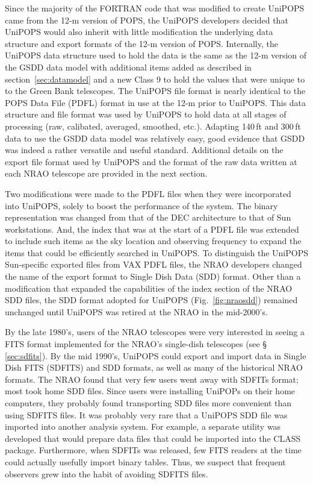 \documentclass[final,authoryear,5p,times,twocolumn]{elsarticle}
\begin{document}
Since the majority of the FORTRAN code that was modified to create
UniPOPS came from the 12-m version of POPS, the UniPOPS developers
decided that UniPOPS would also inherit with little modification the
underlying data structure and export formats of the 12-m version of
POPS.  Internally, the UniPOPS data structure used to hold the data 
is the same as the 12-m version of the GSDD data model with additional 
items added as described in section~\ref{sec:datamodel} and a new Class 9 to hold
the values that were unique to to the Green Bank telescopes. The UniPOPS
file format is nearly identical to the POPS Data File (PDFL) format
in use at the 12-m prior to UniPOPS. This
data structure and file format was used by UniPOPS to hold data at
all stages of processing (raw, calibated, averaged, smoothed, etc.).
Adapting 140\,ft and 300\,ft data to use the GSDD data model was
relatively easy, good evidence that GSDD was indeed a rather versatile
and useful standard.  Additional details on the export file format
used by UniPOPS and the format of the raw data written at each
NRAO telescope are provided in the next section.

Two modifications were made to the PDFL files when they were
incorporated into UniPOPS, solely to boost the performance of the
system.  The binary representation was changed from that of the DEC
architecture to that of Sun workstations.  And, the index that was at
the start of a PDFL file was extended to include such items as the sky
location and observing frequency to expand the items that could be
efficiently searched in UniPOPS.  To distinguish the UniPOPS
Sun-specific exported files from VAX PDFL files, the NRAO developers
changed the name of the export format to Single Dish Data (SDD) format.
Other than a modification that expanded the capabilities of the index
section of the NRAO SDD files, the SDD format adopted for UniPOPS
(Fig.~\ref{fig:nraosdd}) remained unchanged until UniPOPS was retired
at the NRAO in the mid-2000's.  

By the late 1980's, users of the NRAO telescopes were very interested
in seeing a FITS format implemented for the NRAO's single-dish
telescopes (see \S\,\ref{sec:sdfits}). By the mid 1990's,
UniPOPS could export and import data in Single Dish FITS (SDFITS) and
SDD formats, as well as many
of the historical NRAO formats.  The NRAO found that very few users
went away with SDFITs format; most took home SDD files.  Since
users were installing UniPOPs on their home computers, they probably
found transporting SDD files more convenient than using
SDFITS files.  It was probably very rare that a UniPOPS SDD file was
imported into another analysis system.  For example, a separate
utility was developed that would prepare data files that could be
imported into the {\textsc CLASS} package.
Furthermore, when SDFITs was released, few FITS readers at the
time could actually usefully import binary tables.  Thus, we suspect
that frequent observers grew into the habit of avoiding SDFITS files.
\end{document}
